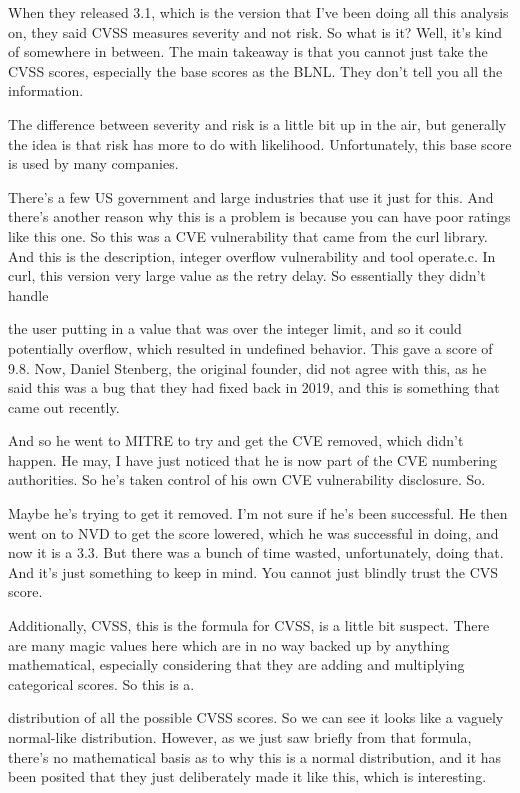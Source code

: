 \documentclass[12pt]{article}
\begin{document}
When they released 3.1, which is the version that I've been doing all this analysis on, they said
CVSS measures severity and not risk. So what is it? Well, it's kind of somewhere in between. The
main takeaway is that you cannot just take the CVSS scores, especially the base scores as the BLNL.
They don't tell you all the information.

The difference between severity and risk is a little bit up in the air, but generally the idea is
that risk has more to do with likelihood. Unfortunately, this base score is used by many companies.

There's a few US government and large industries that use it just for this. And there's another
reason why this is a problem is because you can have poor ratings like this one. So this was a CVE
vulnerability that came from the curl library. And this is the description, integer overflow
vulnerability and tool operate.c. In curl, this version very large value as the retry delay. So
essentially they didn't handle

the user putting in a value that was over the integer limit, and so it could potentially overflow,
which resulted in undefined behavior. This gave a score of 9.8. Now, Daniel Stenberg, the original
founder, did not agree with this, as he said this was a bug that they had fixed back in 2019, and
this is something that came out recently.

And so he went to MITRE to try and get the CVE removed, which didn't happen. He may, I have just
noticed that he is now part of the CVE numbering authorities. So he's taken control of his own CVE
vulnerability disclosure. So.

Maybe he's trying to get it removed. I'm not sure if he's been successful. He then went on to NVD to
get the score lowered, which he was successful in doing, and now it is a 3.3. But there was a bunch
of time wasted, unfortunately, doing that. And it's just something to keep in mind. You cannot just
blindly trust the CVS score.

Additionally, CVSS, this is the formula for CVSS, is a little bit suspect. There are many magic
values here which are in no way backed up by anything mathematical, especially considering that they
are adding and multiplying categorical scores. So this is a.

distribution of all the possible CVSS scores. So we can see it looks like a vaguely normal-like
distribution. However, as we just saw briefly from that formula, there's no mathematical basis as to
why this is a normal distribution, and it has been posited that they just deliberately made it like
this, which is interesting.
\end{document}

